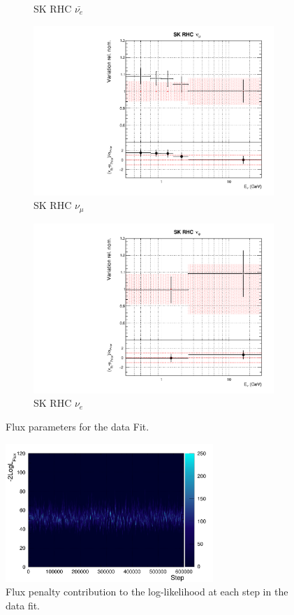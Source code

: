 \begin{figure}
\begin{subfigure}{0.24\textwidth}
  \caption{SK RHC $\bar{\nu_e}$}
\end{subfigure}
\begin{subfigure}{0.24\textwidth}
  \centering
  \includegraphics[width=0.95\linewidth]{figs/datflux14}
  \caption{SK RHC $\nu_{\mu}$}
\end{subfigure}
\begin{subfigure}{0.24\textwidth}
  \centering
  \includegraphics[width=0.95\linewidth]{figs/datflux15}
  \caption{SK RHC $\nu_e$}
\end{subfigure}
\caption{Flux parameters for the data Fit.}
\label{fig:datfluxSK}
\end{figure}

\begin{figure}
\centering
\includegraphics*[width=0.7\textwidth,clip]{figs/llh_fluxdat}
\caption{Flux penalty contribution to the log-likelihood at each step in the data fit.}\label{fig:llh_fluxdat}
\end{figure}

